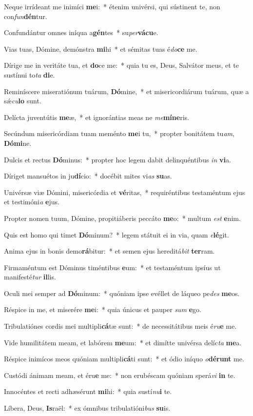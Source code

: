 \item Neque irrídeant me inimíci \textbf{me}i:~* étenim univérsi, qui sústinent te, non con\textit{fun}\textbf{dén}tur.
\item Confundántur omnes iníqua a\textbf{gén}tes~* su\textit{per}\textbf{vá}\textbf{cu}e.
\item Vias tuas, Dómine, demónstra \textbf{mi}hi~* et sémitas tuas é\textit{do}\textbf{ce} me.
\item Dírige me in veritáte tua, et \textbf{do}ce me:~* quia tu es, Deus, Salvátor meus, et te sustínui to\textit{ta} \textbf{di}e.
\item Reminíscere miseratiónum tuárum, \textbf{Dó}mine,~* et misericordiárum tuárum, quæ a sǽ\textit{cu}\textbf{lo} sunt.
\item Delícta juventútis \textbf{me}æ,~* et ignorántias meas ne \textit{me}\textbf{mí}\textbf{ne}ris.
\item Secúndum misericórdiam tuam meménto \textbf{me}i tu,~* propter bonitátem tu\textit{am}, \textbf{Dó}\textbf{mi}ne.
\item Dulcis et rectus \textbf{Dó}minus:~* propter hoc legem dabit delinquéntibus \textit{in} \textbf{vi}a.
\item Díriget mansuétos in ju\textbf{dí}cio:~* docébit mites vi\textit{as} \textbf{su}as.
\item Univérsæ viæ Dómini, misericórdia et \textbf{vé}ritas,~* requiréntibus testaméntum ejus et testimóni\textit{a} \textbf{e}jus.
\item Propter nomen tuum, Dómine, propitiáberis peccáto \textbf{me}o:~* multum \textit{est} \textbf{e}nim.
\item Quis est homo qui timet \textbf{Dó}minum?~* legem státuit ei in via, quam \textit{e}\textbf{lé}git.
\item Anima ejus in bonis demo\textbf{rá}bitur:~* et semen ejus hereditá\textit{bit} \textbf{ter}ram.
\item Firmaméntum est Dóminus timéntibus \textbf{e}um:~* et testaméntum ipsíus ut manifesté\textit{tur} \textbf{il}lis.
\item Oculi mei semper ad \textbf{Dó}minum:~* quóniam ipse evéllet de láqueo pe\textit{des} \textbf{me}os.
\item Réspice in me, et miserére \textbf{me}i:~* quia únicus et pauper \textit{sum} \textbf{e}go.
\item Tribulatiónes cordis mei multipli\textbf{cá}tæ sunt:~* de necessitátibus meis é\textit{ru}\textbf{e} me.
\item Vide humilitátem meam, et labórem \textbf{me}um:~* et dimítte univérsa delíc\textit{ta} \textbf{me}a.
\item Réspice inimícos meos quóniam multipli\textbf{cá}ti sunt:~* et ódio iníquo \textit{o}\textbf{dé}\textbf{runt} me.
\item Custódi ánimam meam, et éru\textbf{e} me:~* non erubéscam quóniam sperá\textit{vi} \textbf{in} te.
\item Innocéntes et recti adhæsérunt \textbf{mi}hi:~* quia sustí\textit{nu}\textbf{i} te.
\item Líbera, Deus, \textbf{Is}raël:~* ex ómnibus tribulatióni\textit{bus} \textbf{su}is.
